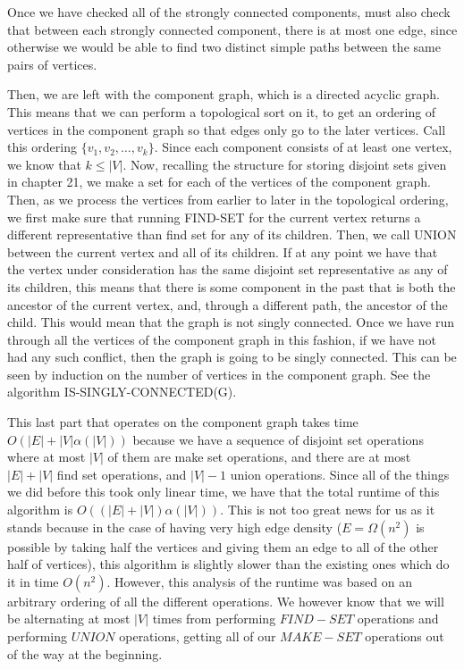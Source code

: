 \documentclass{article}
\begin{document}
Once we have checked all of the strongly connected components, must also check that between each strongly connected component, there is at most one edge, since otherwise we would be able to find two distinct simple paths between the same pairs of vertices.

Then, we are left with the component graph, which is a directed acyclic graph. This means that we can perform a topological sort on it, to get an ordering of vertices in the component graph so that edges only go to the later vertices. Call this ordering $\{v_1,v_2, \ldots, v_k\}$. Since each component consists of at least one vertex, we know that $k\le |V|$. Now, recalling the structure for storing disjoint sets given in chapter 21, we make a set for each of the vertices of the component graph. Then, as we process the vertices from earlier to later in the topological ordering, we first make sure that running FIND-SET for the current vertex returns a different representative than find set for any of its children. Then, we call UNION between the current vertex and all of its children. If at any point we have that the vertex under consideration has the same disjoint set representative as any of its children, this means that there is some component in the past that is both the ancestor of the current vertex, and, through a different path, the ancestor of the child. This would mean that the graph is not singly connected. Once we have run through all the vertices of the component graph in this fashion, if we have not had any such conflict, then the graph is going to be singly connected. This can be seen by induction on the number of vertices in the component graph. See the algorithm IS-SINGLY-CONNECTED(G).

This last part that operates on the component graph takes time $O(|E|+ |V|\alpha(|V|))$ because we have a sequence of disjoint set operations where at most $|V|$ of them are make set operations, and there are at most $|E|+|V|$ find set operations, and $|V|-1$ union operations. Since all of the things we did before this took only linear time, we have that the total runtime of this algorithm is $O((|E|+|V|)\alpha(|V|))$. This is not too great news for us as it stands because in the case of having very high edge density ($E = \Omega(n^2)$ is possible by taking half the vertices and giving them an edge to all of the other half of vertices), this algorithm is slightly slower than the existing ones which do it in time $O(n^2)$. However, this analysis of the runtime was based on an arbitrary ordering of all the different operations. We however know that we will be alternating at most $|V|$ times from performing $FIND-SET$ operations and performing $UNION$ operations, getting all of our $MAKE-SET$ operations out of the way at the beginning.
\end{document}
